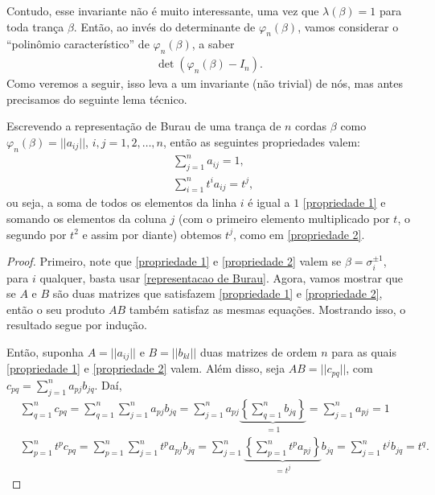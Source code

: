 	\par\vspace{0.3cm} Contudo, esse invariante não é muito interessante, uma vez 
	que $\lambda(\beta) = 1$ para toda trança $\beta$. Então, ao invés do determinante 
	de $\varphi_n(\beta)$, vamos considerar o ``polinômio característico'' de $\varphi_n(\beta)$, 
	a saber
	\begin{align*}
	    \det(\varphi_n(\beta) - I_n).
	\end{align*}
	Como veremos a seguir, isso leva a um invariante (não trivial) de nós, mas antes 
	precisamos do seguinte lema técnico.
	\begin{lemma}
	\label{propriedades representacao de Burau}
		Escrevendo a representação de Burau de uma trança de $n$ cordas $\beta$ como 
		$\varphi_n(\beta) = ||a_{ij}||$, $i,j=1,2,\dots,n$, então as seguintes propriedades valem:
		\begin{align}
		\label{propriedade 1}
		    &\sum_{j=1}^{n}a_{ij} = 1, \\
		\label{propriedade 2}
		    &\sum_{i=1}^{n} t^ia_{ij} = t^j,
		\end{align}
		ou seja, a soma de todos os elementos da linha $i$ é igual a $1$ \eqref{propriedade 1} 
		e somando os elementos da coluna $j$ (com o primeiro elemento multiplicado por $t$, 
		o segundo por $t^2$ e assim por diante) obtemos $t^j$, como em \eqref{propriedade 2}.
	\end{lemma}
	\begin{proof}
		Primeiro, note que \eqref{propriedade 1} e \eqref{propriedade 2} valem se 
		$\beta = \sigma_i^{\pm1}$, para $i$ qualquer, basta usar \eqref{representacao de Burau}. 
		Agora, vamos mostrar que se $A$ e $B$ são duas matrizes que satisfazem 
		\eqref{propriedade 1} e \eqref{propriedade 2}, então o seu produto $AB$ também 
		satisfaz as mesmas equações. Mostrando isso, o resultado segue por indução.
		
		\par\vspace{0.3cm} Então, suponha $A = ||a_{ij}||$ e $B = || b_{kl} ||$ 
		duas matrizes de ordem $n$ para as quais \eqref{propriedade 1} e \eqref{propriedade 2} 
		valem. Além disso, seja $AB = || c_{pq} ||$, com 
		$c_{pq} = \displaystyle{ \sum_{j=1}^{n}a_{pj}b_{jq} }$. Daí,
		\begin{align*}
    		&\sum_{q=1}^{n}c_{pq} 
    		= \sum_{q=1}^{n}\sum_{j=1}^{n}a_{pj}b_{jq} 
    		= \sum_{j=1}^{n}a_{pj}\underbrace{\left\{\sum_{q=1}^{n}b_{jq}\right\}}_{=1} 
    		= \sum_{j=1}^{n}a_{pj} = 1 \\
    		&\sum_{p=1}^{n}t^pc_{pq} 
    		= \sum_{p=1}^{n}\sum_{j=1}^{n}t^pa_{pj}b_{jq} 
    		= \sum_{j=1}^{n}\underbrace{ \left\{ \sum_{p=1}^{n}t^pa_{pj} \right\}}_{=t^j}b_{jq} 
    		= \sum_{j=1}^{n}t^jb_{jq} 
    		= t^q.
		\end{align*}
	\end{proof}
